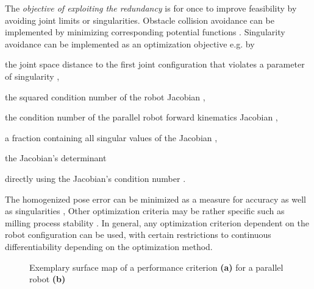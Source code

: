 \documentclass[runningheads]{llncs}
\begin{document}

The \emph{objective of exploiting the redundancy} is for once to improve feasibility by avoiding joint limits \cite{HuoBar2008,ZhuQuCaoYan2013} or singularities.
Obstacle collision avoidance can be implemented by minimizing corresponding potential functions \cite{NakamuraHanYos1987,HowellJacMan2019,FerrentinoSalChi2021}.
Singularity avoidance can be implemented as an optimization objective e.g. by %
\begin{compactitem}
\item the joint space distance to the first joint configuration that violates a parameter of singularity \cite{HuoBar2008},
\item the squared condition number of the robot Jacobian \cite{ZhuQuCaoYan2013,LegerAng2016,CorinaldiAngCal2016}, %
\item the condition number of the parallel robot forward kinematics Jacobian \cite{GosselinSch2016}, %
\item a fraction containing all singular values of the Jacobian \cite{SantosSil2017},
\item the Jacobian's determinant \cite{AgarwalNasBan2016}
\item directly using the Jacobian's condition number \cite{SchapplerOrt2021}.
\end{compactitem}
The homogenized pose error can be minimized as a measure for accuracy as well as singularities \cite{KotlarskiDoHeiOrt2010},
Other optimization criteria may be rather specific such as milling process stability \cite{MousaviGagBouRay2018}.
In general, any optimization criterion dependent on the robot configuration can be used, with certain restrictions to continuous differentiability depending on the optimization method.



\begin{figure}[tb]
\centering

\vspace{-0.3cm}
\caption{Exemplary surface map of a performance criterion \textbf{(a)} for a parallel robot \textbf{(b)}} %
\label{fig:teaser_image}
\end{figure}
\end{document}
